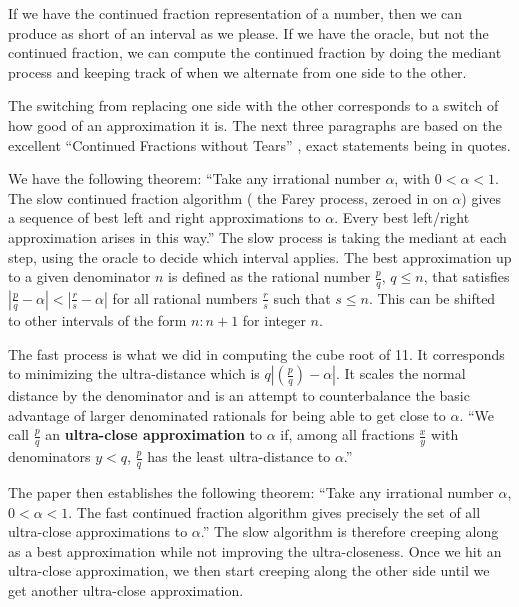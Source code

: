 \documentclass[12pt]{article}
\begin{document}
If we have the continued fraction representation of a number, then we can produce as short of an interval as we please. If we have the oracle, but not the continued fraction, we can compute the continued fraction by doing the mediant process and keeping track of when we alternate from one side to the other. 

The switching from replacing one side with the other corresponds to a switch of how good of an approximation it is. The next three paragraphs are based on the excellent ``Continued Fractions without Tears'' \cite{richards}, exact statements being in quotes.  

We have the following theorem: ``Take any irrational number $\alpha$, with $0 < \alpha < 1$. The slow continued fraction algorithm ( the Farey process, zeroed in on $\alpha$) gives a sequence of best left and right approximations to $\alpha$. Every best left/right approximation arises in this way.'' The slow process is taking the mediant at each step, using the oracle to decide which interval applies. The best approximation up to a given denominator $n$ is defined as the rational number $\frac{p}{q}$, $q  \leq n$, that satisfies $|\frac{p}{q} - \alpha | < |\frac{r}{s} -\alpha|$ for all rational numbers $\frac{r}{s}$ such that $s \leq n$. This can be shifted to other intervals of the form $n:n+1$ for integer $n$.

The fast process is what we did in computing the cube root of 11. It corresponds to minimizing the ultra-distance which is $q|(\frac{p}{q})-\alpha|$. It scales the normal distance by the denominator and is an attempt to counterbalance the basic advantage of larger denominated rationals for being able to get close to $\alpha$.  ``We call $\frac{p}{q}$ an \textbf{ultra-close approximation} to $\alpha$ if, among all fractions $\frac{x}{y}$ with denominators $y < q$, $\frac{p}{q}$ has the least ultra-distance to $\alpha$.''

The paper then establishes the following theorem: ``Take any irrational number $\alpha$, $0 < \alpha < 1$. The fast continued fraction algorithm gives precisely the set of all ultra-close approximations to $\alpha$.''  The slow algorithm is therefore creeping along as a best approximation while not improving the ultra-closeness. Once we hit an ultra-close approximation, we then start creeping along the other side until we get another ultra-close approximation. 
\end{document}
